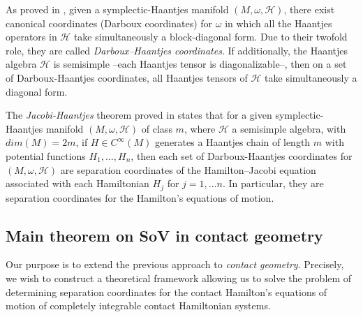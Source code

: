 \documentclass[10pt]{amsart}
\numberwithin{equation}{section}
\theoremstyle{definition}
\begin{document}
As proved in \cite{TT2022AMPA}, given a symplectic-Haantjes manifold $(M,\omega,\mathscr{H})$, there exist canonical coordinates (Darboux coordinates) for $\omega$ in which all the Haantjes operators in $\mathscr{H}$ take simultaneously a block-diagonal form. Due to their twofold role, they are called \textit{Darboux–Haantjes coordinates}. If additionally, the Haantjes algebra $\mathscr{H}$ is semisimple --each Haantjes tensor is diagonalizable--, then on a set of Darboux-Haantjes coordinates, all Haantjes tensors of $\mathscr{H}$ take simultaneously a diagonal form.
\vspace{2mm}

The \textit{Jacobi-Haantjes} theorem proved in \cite{RTT2022CNS} states that for a given symplectic-Haantjes manifold $(M,\omega,\mathscr{H})$ of class $m$, where $\mathscr{H}$ a semisimple algebra, with $dim(M)=2m$,  if $H\in C^{\infty}(M)$ generates a Haantjes chain of length $m$ with potential functions $H_{1},\ldots,H_{n}$, then each set of Darboux-Haantjes coordinates for $(M,\omega,\mathscr{H})$ are separation coordinates of the Hamilton--Jacobi equation associated with each Hamiltonian $H_{j}$ for $j=1,\ldots n$. In particular, they are separation coordinates for the Hamilton's equations of motion.



\subsection{Main theorem on SoV in contact geometry}
Our purpose is to extend the previous approach to \textit{contact geometry}. Precisely, we wish to construct a theoretical framework allowing us to solve the problem of determining separation coordinates for the contact Hamilton's equations of motion of completely integrable contact Hamiltonian systems. 
\vspace{2mm}
\end{document}
